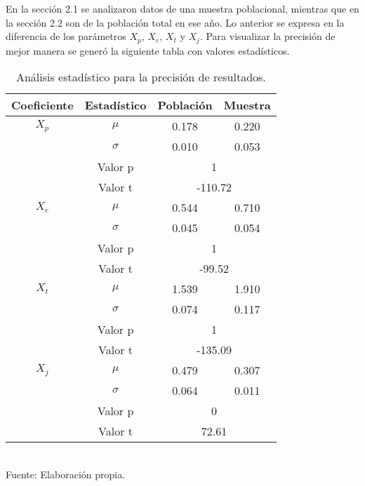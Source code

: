 \documentclass[12pt]{article} %
\begin{document}
En la sección 2.1 se analizaron datos de una muestra poblacional, mientras que en la sección 2.2 son de la población total en ese año.
Lo anterior se expresa en la diferencia de los parámetros $X_p$, $X_e$, $X_t$ y $X_j$. Para visualizar la precisión de mejor manera se generó la
siguiente tabla con valores estadísticos.\\

\begin{table}[H]
    \caption{Análisis estadístico para la precisión de resultados.}
    \vspace{0.2cm}
    \centering
    \begin{tabular}{|c|c|c|c|}
    \hline
    \textbf{Coeficiente} & \textbf{Estadístico} & \textbf{Población} & \textbf{Muestra} \\ \hline
    $X_p$ & \multicolumn{1}{|c|}{\(\mu\)} & 0.178 & 0.220 \\ \cline{2-4}
    & \multicolumn{1}{|c|}{\(\sigma\)} & 0.010 & 0.053 \\ \cline{2-4}
    & \multicolumn{1}{|c|}{Valor p} & \multicolumn{2}{|c|}{1} \\ \cline{2-4}
    & \multicolumn{1}{|c|}{Valor t} & \multicolumn{2}{|c|}{-110.72} \\ \hline
    
    $X_e$ & \multicolumn{1}{|c|}{\(\mu\)} & 0.544 & 0.710 \\ \cline{2-4}
    & \multicolumn{1}{|c|}{\(\sigma\)} & 0.045 & 0.054 \\ \cline{2-4}
    & \multicolumn{1}{|c|}{Valor p} & \multicolumn{2}{|c|}{1} \\ \cline{2-4}
    & \multicolumn{1}{|c|}{Valor t} & \multicolumn{2}{|c|}{-99.52} \\ \hline
    
    $X_t$ & \multicolumn{1}{|c|}{\(\mu\)} & 1.539 & 1.910 \\ \cline{2-4}
    & \multicolumn{1}{|c|}{\(\sigma\)} & 0.074 & 0.117 \\ \cline{2-4}
    & \multicolumn{1}{|c|}{Valor p} & \multicolumn{2}{|c|}{1} \\ \cline{2-4}
    & \multicolumn{1}{|c|}{Valor t} & \multicolumn{2}{|c|}{-135.09} \\ \hline
    
    $X_j$ & \multicolumn{1}{|c|}{\(\mu\)} & 0.479 & 0.307 \\ \cline{2-4}
    & \multicolumn{1}{|c|}{\(\sigma\)} & 0.064 & 0.011 \\ \cline{2-4}
    & \multicolumn{1}{|c|}{Valor p} & \multicolumn{2}{|c|}{0} \\ \cline{2-4}
    & \multicolumn{1}{|c|}{Valor t} & \multicolumn{2}{|c|}{72.61} \\ \hline
    \end{tabular}
    \\Fuente: Elaboración propia.
\end{table}
\end{document}
